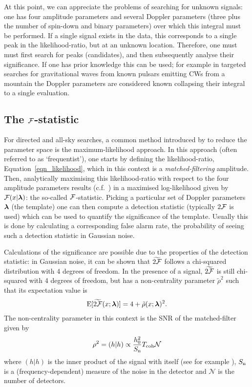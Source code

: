 \documentclass[aps, prd, twocolumn, superscriptaddress, floatfix, showpacs, nofootinbib, longbibliography]{revtex4-1}
\begin{document}
At this point, we can appreciate the problems of searching for unknown signals:
one has four amplitude parameters and several Doppler parameters (three plus
the number of spin-down and binary parameters) over which this integral must be
performed. If a single signal exists in the data, this corresponds to a single
peak in the likelihood-ratio, but at an unknown location. Therefore, one must
must first search for peaks (candidates), and then subsequently analyse their
significance. If one has prior knowledge this can be used; for example in
targeted searches for gravitational waves from known pulsars emitting CWs from
a mountain the Doppler parameters are considered known collapsing their
integral to a single evaluation.

\subsection{The ${\mathcal{F}}$-statistic}

For directed and all-sky searches, a common method introduced by
\citet{jks1998} to reduce the parameter space is the maximum-likelihood
approach. In this approach (often referred to as `frequentist'), one starts by
defining the likelihood-ratio, Equation~\eqref{eqn_likelihood}, which in this
context is a \emph{matched-filtering} amplitude. Then, analytically maximising
this likelihood-ratio with respect to the four amplitude parameters results
(c.f.~\citet{prix2009}) in a maximised log-likelihood given by ${\mathcal{F}}(x|
\boldsymbol{\mathbf{\lambda}})$: the so-called ${\mathcal{F}}$-statistic. Picking a particular set of Doppler
parameters $\boldsymbol{\mathbf{\lambda}}$ (the template) one can then compute a detection statistic
(typically $2{\mathcal{F}}$ is used) which can be used to quantify the significance of the
template. Usually this is done by calculating a corresponding false alarm rate,
the probability of seeing such a detection statistic in Gaussian noise.

Calculations of the significance are possible due to the properties of the
detection statistic: in Gaussian noise, it can be shown \citep{jks1998,
cutlershutz2005} that $\widetilde{2{\mathcal{F}}}$ follows a chi-squared distribution with
4 degrees of freedom. In the presence of a signal, $\widetilde{2{\mathcal{F}}}$ is
still chi-squared with 4 degrees of freedom, but has a non-centrality parameter
$\tilde{\rho}^{2}$ such that its expectation value is
\begin{equation}
\textrm{E}[\widetilde{2{\mathcal{F}}}(x; \boldsymbol{\mathbf{\lambda}})] = 4 + \tilde{\rho}(x; \boldsymbol{\mathbf{\lambda}})^2.
\label{eqn_twoF_expectation}
\end{equation}
The non-centrality parameter in this context is the SNR of the matched-filter
given by
\begin{equation}
\rho^{2} = (h | h) \propto \frac{h_0^2}{S_{\rm n}}T_{\rm coh} \mathcal{N}
\end{equation}
where $(h|h)$ is the inner product of the signal with itself (see for example
\citet{prix2009}), $S_{\rm n}$ is a (frequency-dependent) measure of the noise in
the detector and $\mathcal{N}$ is the number of detectors.
\end{document}
